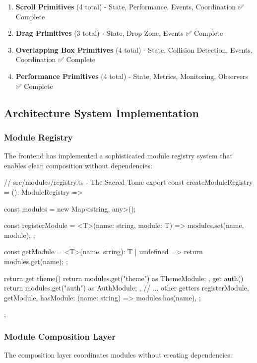 \documentclass[11pt]{article}
\begin{document}
\begin{enumerate}
\item \textbf{Scroll Primitives} (4 total) - State, Performance, Events, Coordination ✅ Complete
\item \textbf{Drag Primitives} (3 total) - State, Drop Zone, Events ✅ Complete
\item \textbf{Overlapping Box Primitives} (4 total) - State, Collision Detection, Events, Coordination ✅ Complete
\item \textbf{Performance Primitives} (4 total) - State, Metrics, Monitoring, Observers ✅ Complete
\end{enumerate}

\subsection{Architecture System Implementation}

\subsubsection{Module Registry}

The frontend has implemented a sophisticated module registry system that enables clean composition without dependencies:

\begin{typescriptcode}
// src/modules/registry.ts - The Sacred Tome
export const createModuleRegistry = (): ModuleRegistry => {
    const modules = new Map<string, any>();
    
    const registerModule = <T>(name: string, module: T) => {
        modules.set(name, module);
    };
    
    const getModule = <T>(name: string): T | undefined => {
        return modules.get(name);
    };
    
    return {
        get theme() { return modules.get("theme") as ThemeModule; },
        get auth() { return modules.get("auth") as AuthModule; },
        // ... other getters
        registerModule,
        getModule,
        hasModule: (name: string) => modules.has(name),
    };
};
\end{typescriptcode}

\subsubsection{Module Composition Layer}

The composition layer coordinates modules without creating dependencies:
\end{document}
